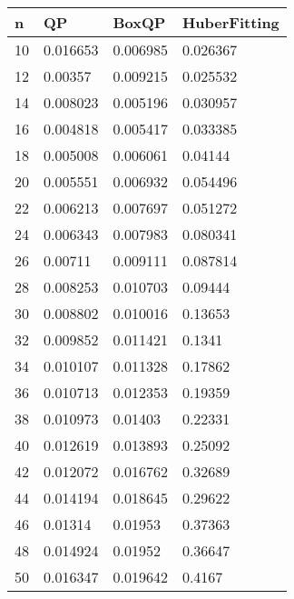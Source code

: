\begin{tabular}{llll}
n & QP & BoxQP & HuberFitting \\ 
\hline 
10 & 0.016653 & 0.006985 & 0.026367 \\ 
12 & 0.00357 & 0.009215 & 0.025532 \\ 
14 & 0.008023 & 0.005196 & 0.030957 \\ 
16 & 0.004818 & 0.005417 & 0.033385 \\ 
18 & 0.005008 & 0.006061 & 0.04144 \\ 
20 & 0.005551 & 0.006932 & 0.054496 \\ 
22 & 0.006213 & 0.007697 & 0.051272 \\ 
24 & 0.006343 & 0.007983 & 0.080341 \\ 
26 & 0.00711 & 0.009111 & 0.087814 \\ 
28 & 0.008253 & 0.010703 & 0.09444 \\ 
30 & 0.008802 & 0.010016 & 0.13653 \\ 
32 & 0.009852 & 0.011421 & 0.1341 \\ 
34 & 0.010107 & 0.011328 & 0.17862 \\ 
36 & 0.010713 & 0.012353 & 0.19359 \\ 
38 & 0.010973 & 0.01403 & 0.22331 \\ 
40 & 0.012619 & 0.013893 & 0.25092 \\ 
42 & 0.012072 & 0.016762 & 0.32689 \\ 
44 & 0.014194 & 0.018645 & 0.29622 \\ 
46 & 0.01314 & 0.01953 & 0.37363 \\ 
48 & 0.014924 & 0.01952 & 0.36647 \\ 
50 & 0.016347 & 0.019642 & 0.4167 \\ 
\hline 
\end{tabular}
